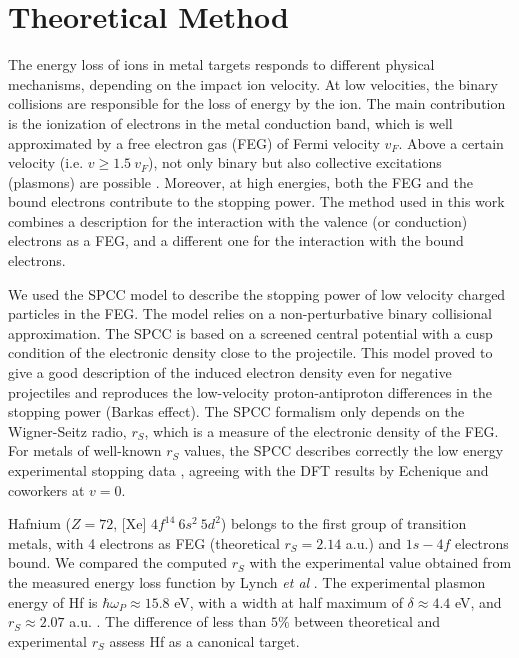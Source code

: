 \documentclass[aps,prb,reprint,groupedaddress]{revtex4-1}
\begin{document}
\section{Theoretical Method} 
\label{theory}
The energy loss of ions in metal targets responds to different physical mechanisms, depending on the impact ion velocity. At low velocities, the binary collisions are responsible for the loss of energy by the ion. The main contribution is the ionization of electrons in the metal conduction band, which is well approximated by a free electron gas (FEG) of Fermi velocity $v_F$. Above a certain velocity (i.e. $v\geq 1.5 \ v_F$), not only binary but also collective excitations (plasmons) are possible \cite{mon17}. Moreover, at high energies, both the FEG and the bound electrons contribute to the stopping power. The method used in this work combines a description for the interaction with the valence (or conduction) electrons as a FEG, and a different one for the interaction with the bound electrons.

We used the SPCC model \cite{mon17} to describe the stopping power of low velocity charged particles in the FEG. The model relies on a non-perturbative binary collisional approximation. The SPCC \cite{mon17} is based on a screened central potential with a cusp condition of the electronic density close to the projectile. This model proved to give a good description of the induced electron density even for negative projectiles \cite{mon17} and reproduces the low-velocity proton-antiproton differences in the stopping power (Barkas effect). The SPCC formalism only depends on the Wigner-Seitz radio, $r_S$, which is a measure of the electronic density of the FEG. For metals of well-known $r_S$ values, the SPCC describes correctly the low energy experimental stopping data \cite{mon17}, agreeing with the DFT results by Echenique and coworkers \cite{eche81,nagy89} at $v=0$. 

Hafnium ($Z=72$, [Xe] $4f^{14} \ 6s^2 \ 5d^2$) belongs to the first group of transition metals, with  4 electrons as FEG (theoretical $r_S=2.14$ a.u.) and $1s-4f$ electrons bound. We compared the computed $r_S$ with the experimental value obtained from the measured energy loss function by Lynch \textit{et al} \cite{lynch75}. The experimental plasmon energy of Hf is $\hbar\omega_P \approx 15.8$ eV, with a width at half maximum of $\delta \approx 4.4$ eV, and $r_S \approx 2.07$ a.u. \cite{lynch75}. The difference of less than $5\%$ between theoretical and experimental $r_S$ assess Hf as a canonical target\cite{mon17}.
\end{document}
